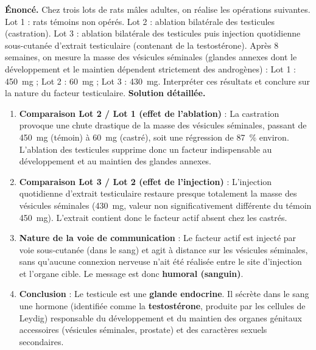 \documentclass[11pt]{article}
\begin{document}
\begin{exoresolu}
\textbf{Énoncé.} Chez trois lots de rats mâles adultes, on réalise les opérations suivantes. Lot 1 : rats témoins non opérés. Lot 2 : ablation bilatérale des testicules (castration). Lot 3 : ablation bilatérale des testicules puis injection quotidienne sous-cutanée d'extrait testiculaire (contenant de la testostérone). Après 8 semaines, on mesure la masse des vésicules séminales (glandes annexes dont le développement et le maintien dépendent strictement des androgènes) : Lot 1 : \SI{450}{mg} ; Lot 2 : \SI{60}{mg} ; Lot 3 : \SI{430}{mg}. Interpréter ces résultats et conclure sur la nature du facteur testiculaire.
\tcblower
\textbf{Solution détaillée.}
\begin{enumerate}
\item \textbf{Comparaison Lot 2 / Lot 1 (effet de l'ablation)} : La castration provoque une chute drastique de la masse des vésicules séminales, passant de \SI{450}{mg} (témoin) à \SI{60}{mg} (castré), soit une régression de \SI{87}{\%} environ. L'ablation des testicules supprime donc un facteur indispensable au développement et au maintien des glandes annexes.
\item \textbf{Comparaison Lot 3 / Lot 2 (effet de l'injection)} : L'injection quotidienne d'extrait testiculaire restaure presque totalement la masse des vésicules séminales (\SI{430}{mg}, valeur non significativement différente du témoin \SI{450}{mg}). L'extrait contient donc le facteur actif absent chez les castrés.
\item \textbf{Nature de la voie de communication} : Le facteur actif est injecté par voie sous-cutanée (dans le sang) et agit à distance sur les vésicules séminales, sans qu'aucune connexion nerveuse n'ait été réalisée entre le site d'injection et l'organe cible. Le message est donc \textbf{humoral (sanguin)}.
\item \textbf{Conclusion} : Le testicule est une \textbf{glande endocrine}. Il sécrète dans le sang une hormone (identifiée comme la \textbf{testostérone}, produite par les cellules de Leydig) responsable du développement et du maintien des organes génitaux accessoires (vésicules séminales, prostate) et des caractères sexuels secondaires.
\end{enumerate}
\end{exoresolu}
\end{document}

